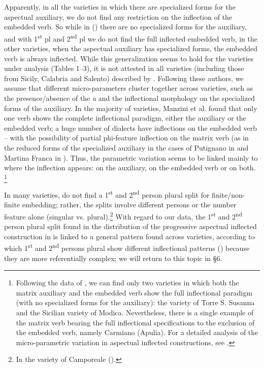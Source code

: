 \documentclass[output=paper]{langsci/langscibook}
\begin{document}
Apparently, in all the varieties in which there are specialized forms for the aspectual auxiliary, we do not find any restriction on the inflection of the embedded verb. So while in  () there are no specialized forms for the auxiliary, and with 1\textsuperscript{st} pl and 2\textsuperscript{nd} pl we do not find the full inflected embedded verb, in the other varieties, when the aspectual auxiliary has specialized forms, the embedded verb is always inflected. While this generalization seems to hold for the  varieties under analysis (Tables 1–3), it is not attested in all varieties (including those from Sicily, Calabria and Salento) described by \citet{Manzini2017}. Following these authors, we assume that different micro{}-parameters cluster together across varieties, such as the presence\slash absence of the  \textit{a} and the inflectional morphology on the specialized forms of the auxiliary. In the majority of varieties, Manzini et al. found that only one verb shows the complete inflectional paradigm, either the auxiliary or the embedded verb; a huge number of dialects have inflections on the embedded verb – with the possibility of partial phi{}-feature inflection on the matrix verb (as in the reduced forms of the specialized auxiliary in the cases of Putignano in  and Martina Franca in ). Thus, the parametric variation seems to be linked mainly to where the inflection appears: on the auxiliary, on the embedded verb or on both. \footnote{Following the data of \citet{Manzini2017}, we can find only two varieties in which both the matrix auxiliary and the embedded verb show the full inflectional paradigm (with no specialized forms for the auxiliary): the  variety of Torre S. Susanna and the Sicilian variety of Modica. Nevertheless, there is a single example of the matrix verb bearing the full inflectional specifications to the exclusion of the embedded verb, namely Carmiano (Apulia). For a detailed analysis of the micro-parametric variation in aspectual inflected constructions, see \citet{Manzini2017}.} 

In many varieties, \citet{Manzini2017} do not find a 1\textsuperscript{st} and 2\textsuperscript{nd} person plural split for finite\slash non-finite embedding; rather, the splits involve different persons or the number feature alone (singular vs. plural).\footnote{In the variety of Camporeale (\citealt[38]{Manzini2017}).} With regard to our data, the 1\textsuperscript{st} and 2\textsuperscript{nd} person plural split found in the distribution of the progressive aspectual inflected construction in  is linked to a general pattern found across  varieties, according to which 1\textsuperscript{st} and 2\textsuperscript{nd} persons plural show different inflectional patterns (\citealt{Manzini2005,Manzini2007,Manzini2011Bio}) because they are more referentially complex; we will return to this topic in §6. 
\end{document}
